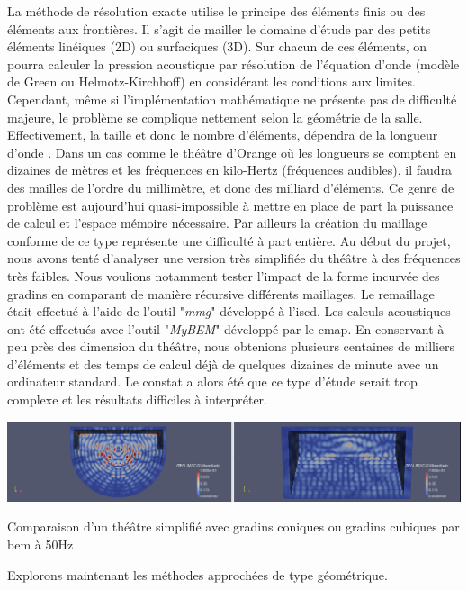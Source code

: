 La méthode de résolution exacte utilise le principe des éléments finis ou des éléments aux frontières. Il s'agit de mailler le domaine d'étude par des petits éléments linéiques (2D) ou surfaciques (3D). Sur chacun de ces éléments, on pourra calculer la pression acoustique par résolution de l'équation d'onde (modèle de Green ou Helmotz-Kirchhoff) en considérant les conditions aux limites. Cependant, même si l'implémentation mathématique ne présente pas de difficulté majeure, le problème se complique nettement selon la géométrie de la salle. Effectivement, la taille et donc le nombre d'éléments, dépendra de la longueur d'onde \cite[p. 740]{beamtracing}. Dans un cas comme le théâtre d'Orange où les longueurs se comptent en dizaines de mètres et les fréquences en kilo-Hertz (fréquences audibles), il faudra des mailles de l'ordre du millimètre, et donc des milliard d'éléments. Ce genre de problème est aujourd'hui quasi-impossible à mettre en place de part la puissance de calcul et l'espace mémoire nécessaire. Par ailleurs la création du maillage conforme de ce type représente une difficulté à part entière.
Au début du projet, nous avons tenté d'analyser une version très simplifiée du théâtre à des fréquences très faibles. Nous voulions notamment tester l'impact de la forme incurvée des gradins en comparant de manière récursive différents maillages. Le remaillage était effectué à l'aide de l'outil "\textit{mmg}" développé à l'\gls{iscd}. Les calculs acoustiques ont été effectués avec l'outil "\textit{MyBEM}" développé par le \gls{cmap}. En conservant à peu près des dimension du théâtre, nous obtenions plusieurs centaines de milliers d'éléments et des temps de calcul déjà de quelques dizaines de minute avec un ordinateur standard. Le constat a alors été que ce type d'étude serait trop complexe et les résultats difficiles à interpréter.

\begin{figureth}
	\includegraphics[width=\linewidth]{images/BEM}
	\caption{Comparaison d'un théâtre simplifié avec gradins coniques ou gradins cubiques par \gls{bem} à 50Hz}
	\label{BEM}
\end{figureth}

Explorons maintenant les méthodes approchées de type géométrique.

